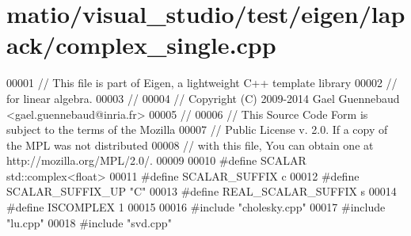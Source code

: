 \hypertarget{matio_2visual__studio_2test_2eigen_2lapack_2complex__single_8cpp_source}{}\section{matio/visual\+\_\+studio/test/eigen/lapack/complex\+\_\+single.cpp}
\label{matio_2visual__studio_2test_2eigen_2lapack_2complex__single_8cpp_source}

\begin{DoxyCode}
00001 \textcolor{comment}{// This file is part of Eigen, a lightweight C++ template library}
00002 \textcolor{comment}{// for linear algebra.}
00003 \textcolor{comment}{//}
00004 \textcolor{comment}{// Copyright (C) 2009-2014 Gael Guennebaud <gael.guennebaud@inria.fr>}
00005 \textcolor{comment}{//}
00006 \textcolor{comment}{// This Source Code Form is subject to the terms of the Mozilla}
00007 \textcolor{comment}{// Public License v. 2.0. If a copy of the MPL was not distributed}
00008 \textcolor{comment}{// with this file, You can obtain one at http://mozilla.org/MPL/2.0/.}
00009 
00010 \textcolor{preprocessor}{#define SCALAR        std::complex<float>}
00011 \textcolor{preprocessor}{#define SCALAR\_SUFFIX c}
00012 \textcolor{preprocessor}{#define SCALAR\_SUFFIX\_UP "C"}
00013 \textcolor{preprocessor}{#define REAL\_SCALAR\_SUFFIX s}
00014 \textcolor{preprocessor}{#define ISCOMPLEX     1}
00015 
00016 \textcolor{preprocessor}{#include "cholesky.cpp"}
00017 \textcolor{preprocessor}{#include "lu.cpp"}
00018 \textcolor{preprocessor}{#include "svd.cpp"}
\end{DoxyCode}
